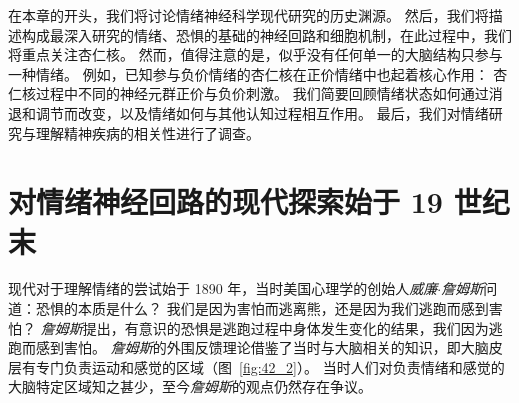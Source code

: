 在本章的开头，我们将讨论情绪神经科学现代研究的历史渊源。
然后，我们将描述构成最深入研究的情绪、恐惧的基础的神经回路和细胞机制，在此过程中，我们将重点关注杏仁核。
然而，值得注意的是，似乎没有任何单一的大脑结构只参与一种情绪。
例如，已知参与负价情绪的杏仁核在正价情绪中也起着核心作用：
杏仁核过程中不同的神经元群正价与负价刺激。
我们简要回顾情绪状态如何通过消退和调节而改变，以及情绪如何与其他认知过程相互作用。
最后，我们对情绪研究与理解精神疾病的相关性进行了调查。



\section{对情绪神经回路的现代探索始于 19 世纪末}
现代对于理解情绪的尝试始于 1890 年，当时美国心理学的创始人\textit{威廉$\cdot$詹姆斯}问道：恐惧的本质是什么？
我们是因为害怕而逃离熊，还是因为我们逃跑而感到害怕？
\textit{詹姆斯}提出，有意识的恐惧是逃跑过程中身体发生变化的结果，我们因为逃跑而感到害怕。
\textit{詹姆斯}的外围反馈理论借鉴了当时与大脑相关的知识，即大脑皮层有专门负责运动和感觉的区域（图~\ref{fig:42_2}）。
当时人们对负责情绪和感觉的大脑特定区域知之甚少，至今\textit{詹姆斯}的观点仍然存在争议。


